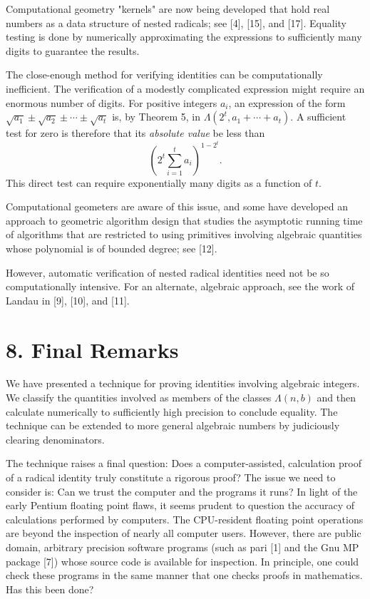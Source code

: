 \documentclass[11pt,letterpaper]{article}
\begin{document}
Computational geometry "kernels" are now being developed that hold real numbers as a data structure of nested radicals; see [4], [15], and [17]. Equality testing is done by numerically approximating the expressions to sufficiently many digits to guarantee the results.

The close-enough method for verifying identities can be computationally inefficient. The verification of a modestly complicated expression might require an enormous number of digits. For positive integers $a_i$, an expression of the form
$\sqrt{a_1}\pm\sqrt{a_2}\pm\cdots\pm\sqrt{a_t}$ is, by Theorem 5, in
$\Lambda(2^t,a_1+\cdots+a_t)$. A sufficient test for zero is therefore that its \emph{absolute value} be less than
\[
 \left(2^t\sum_{i=1}^t a_i\right)^{1-2^t}.
\]
This direct test can require exponentially many digits as a function of $t$.

Computational geometers are aware of this issue, and some have developed an approach to geometric algorithm design that studies the asymptotic running time of algorithms that are restricted to using primitives involving algebraic quantities whose polynomial is of bounded degree; see [12].

However, automatic verification of nested radical identities need not be so computationally intensive. For an alternate, algebraic approach, see the work of Landau in [9], [10], and [11].

\section*{8. Final Remarks} We have presented a technique for proving identities involving algebraic integers. We classify the quantities involved as members of the classes $\Lambda(n, b)$ and then calculate numerically to sufficiently high precision to conclude equality. The technique can be extended to more general algebraic numbers by judiciously clearing denominators.

The technique raises a final question: Does a computer-assisted, calculation proof of a radical identity truly constitute a rigorous proof? The issue we need to consider is: Can we trust the computer and the programs it runs? In light of the early Pentium floating point flaws, it seems prudent to question the accuracy of calculations performed by computers. The CPU-resident floating point operations are beyond the inspection of nearly all computer users. However, there are public domain, arbitrary precision software programs (such as pari [1] and the Gnu MP package [7]) whose source code is available for inspection. In principle, one could check these programs in the same manner that one checks proofs in mathematics. Has this been done?
\end{document}
